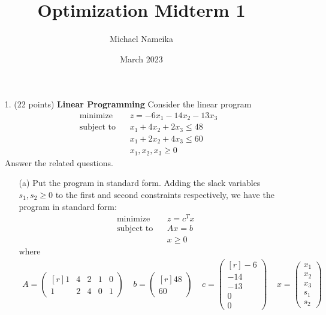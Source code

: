 \documentclass{article}
\title{Optimization Midterm 1}
\author{Michael Nameika}
\date{March 2023}
\begin{document}
\maketitle
\begin{itemize}
    \item[1.] (22 points) \textbf{Linear Programming}
    Consider the linear program
    \begin{align*}
        \text{minimize} \:\:\:\: &z = -6x_1 - 14x_2 - 13x_3\\
        \text{subject to} \:\:\:\: &x_1 + 4x_2 + 2x_3 \leq 48\\
        &x_1 + 2x_2 + 4x_3 \leq 60\\
        &x_1,x_2,x_3 \geq 0
    \end{align*}
    Answer the related questions.
    \begin{itemize}
        \item[(a)] Put the program in standard form.
        \newline\newline
        Adding the slack variables $s_1, s_2 \geq 0$ to the first and second constraints respectively, we have the program in standard form:
        \begin{align*}
            \text{minimize} \:\:\:\: &z = c^Tx\\
            \text{subject to} \:\:\:\: &Ax = b\\
            &x \geq 0
        \end{align*}
        where 
        \begin{align*}
            A = \begin{pmatrix*}[r]
                1 & 4 & 2 & 1 & 0\\
                1 & 2 & 4 & 0 & 1
            \end{pmatrix*}
            \:\:\:\:\:
            b = \begin{pmatrix*}[r]
                48\\
                60
            \end{pmatrix*}
            \:\:\:\:\:
            c = \begin{pmatrix*}[r]
                -6\\
                -14\\
                -13\\
                0\\
                0
            \end{pmatrix*}
            \:\:\:\:\:
            x = \begin{pmatrix}
                x_1\\
                x_2\\
                x_3\\
                s_1\\
                s_2
            \end{pmatrix}
        \end{align*}        


\end{itemize}
\end{itemize}
\end{document}

